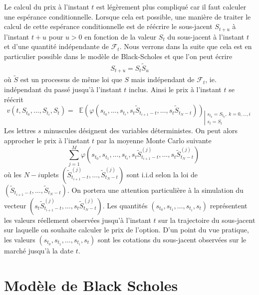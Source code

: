 \documentclass[a4paper,11pt]{article}
\def\cf{{\mathcal F}}
\def\E{{\mathbb E}}
\def\inv#1{\mathop{\frac{1}{ #1}}\nolimits}
\def\expp#1{\mathop {\mathrm{e}^{ #1}}}
\begin{document}
Le calcul du prix à l'instant $t$ est légèrement plus compliqué car il faut calculer une espérance conditionnelle. Lorsque cela est possible, une manière de traiter le calcul de cette espérance conditionnelle est de réécrire le sous-jacent $S_{t+u}$ à l'instant $t+u$ pour $u>0$ en fonction de la valeur $S_t$ du sous-jacent à l'instant $t$ et d'une quantité indépendante de $\cf_t$. Nous verrons dans la suite que cela est en particulier possible dans le modèle de Black-Scholes et que l'on peut écrire
\begin{align*}
  S_{t+u} = S_t \tilde S_u
\end{align*}
où $\tilde S$ est un processus de même loi que $S$ mais indépendant de $\cf_t$, ie. indépendant du passé jusqu'à l'instant $t$ inclus.  Ainsi le prix à l'instant $t$ se réécrit
\begin{equation*}
  v(t, S_{t_0}, \dots, S_{t_i}, S_t) = \expp{-r (T - t)} \E(\varphi(s_{t_0}, \dots,
  s_{t_i}, s_t \tilde S_{t_{i+1} - t}, \dots,  s_t \tilde S_{t_N - t}))_{\left|
  \begin{array}{l}
    s_{t_k} = S_{t_k}, \; k=0,\dots,i \\
    s_t = S_t
  \end{array}\right.}
\end{equation*}
Les lettres $s$ minuscules désignent des variables déterministes.  On peut alors approcher le prix à l'instant $t$ par la moyenne Monte Carlo suivante
\begin{equation}
  \label{MC_t}
  \expp{-r (T - t)} \inv{M} \sum_{j=1}^M \varphi(s_{t_0}, s_{t_1}, \dots,
  s_{t_i}, s_t \tilde S_{t_{i+1} - t}^{(j)}, \dots,  s_t \tilde S_{t_N - t}^{(j)})
\end{equation}
où les $N-i$uplets $(\tilde S_{t_{i+1} - t}^{(j)}, \dots, \tilde S_{t_N - t}^{(j)})$ sont i.i.d selon la loi de $(\tilde S_{t_{i+1} - t}, \dots, \tilde S_{t_N - t})$. On portera une attention particulière à la simulation du vecteur $(s_t \tilde S_{t_{i+1} - t}^{(j)}, \dots,  s_t \tilde S_{t_N - t}^{(j)})$. Les quantités $(s_{t_0}, s_{t_1}, \dots, s_{t_i}, s_t)$ représentent les valeurs réellement observées jusqu'à l'instant $t$ sur la trajectoire du sous-jacent sur laquelle on souhaite calculer le prix de l'option. D'un point du vue pratique, les valeurs $(s_{t_0}, s_{t_1}, \dots, s_{t_i}, s_t)$ sont les cotations du sous-jacent observées sur le marché jusqu'à la date $t$.


\section{Modèle de Black Scholes}
\label{sec:modele}
\end{document}
